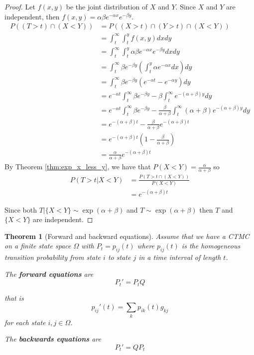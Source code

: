 \documentclass{article}
\theoremstyle{plain}
\newtheorem{theorem}{Theorem}[section]
\theoremstyle{definition}
\theoremstyle{remark}
\numberwithin{equation}{section}
\begin{document}
\begin{proof}
Let $f(x,y)$ be the joint distribution of $X$ and $Y$.
Since $X$ and $Y$ are independent, then $f(x,y) = \alpha \beta e^{-\alpha x} e^{-\beta y}$.
\begin{align*}
    P((T > t) \cap (X < Y)) &= P((X > t) \cap (Y > t) \cap (X < Y))\\
    &= \int_t^\infty \int_t^y f(x,y) dx dy\\
    &= \int_t^\infty \int_t^y \alpha \beta e^{-\alpha x} e^{-\beta y} dx dy\\
    &= \int_t^\infty \beta e^{-\beta y} \left(\int_t^y \alpha e^{-\alpha x} dx \right)  dy\\
    &= \int_t^\infty \beta e^{-\beta y} \left( e^{-\alpha t} - e^{-\alpha y} \right) dy\\
    &= e^{-\alpha t} \int_t^\infty \beta e^{-\beta y} - \beta \int_t^\infty e^{-(\alpha + \beta) y} dy\\
    &= e^{-\alpha t} \int_t^\infty \beta e^{-\beta y} - \frac{\beta}{\alpha + \beta} \int_t^\infty (\alpha + \beta) e^{-(\alpha + \beta) y} dy\\
    &= e^{-(\alpha + \beta) t} - \frac{\beta}{\alpha + \beta} e^{-(\alpha + \beta) t}\\
    &= e^{-(\alpha + \beta) t} \left(1 - \frac{\beta}{\alpha + \beta} \right)\\
    &= \frac{\alpha}{\alpha + \beta} e^{-(\alpha + \beta) t}
\end{align*}
By Theorem \ref{thm:exp_x_less_y}, we have that $P(X < Y) = \frac{\alpha}{\alpha + \beta}$ so
\begin{align*}
    P(T > t | X < Y) &= \frac{P(T > t \cap (X < Y))}{P(X < Y)}\\
    &= e^{-(\alpha + \beta) t}
\end{align*}

Since both $T | \{X < Y\} \sim \exp(\alpha + \beta)$ and $T \sim \exp(\alpha + \beta)$ then $T$ and $\{X < Y\}$ are independent.
\end{proof}

\begin{theorem}[Forward and backward equations] \cite{grimmett2001}
Assume that we have a CTMC on a finite state space $\Omega$ with $P_t = p_{ij}(t)$ where $p_{ij}(t)$ is the homogeneous transition probability from state $i$ to state $j$ in a time interval of length $t$.

The \textbf{forward equations} are
\begin{equation}
    \label{eq:forward_eqs}
    P_t' = P_t Q
\end{equation}

that is
$$
p_{ij}'(t) = \sum_{k} p_{ik}(t) g_{kj}
$$
for each state $i,j \in \Omega$.

The \textbf{backwards equations} are
\begin{equation}
    \label{eq:backwards_eqs}
    P_t' = Q P_t
\end{equation}
\end{theorem}
\end{document}
